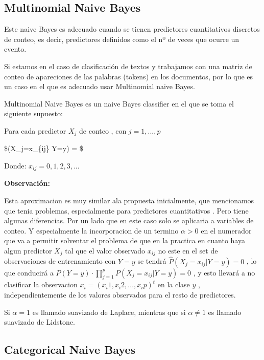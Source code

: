 \documentclass[
  11pt,
  a4paper,
]{article}
\begin{document}
\hypertarget{multinomial-naive-bayes}{%
\subsection{Multinomial Naive Bayes}\label{multinomial-naive-bayes}}

Este naive Bayes es adecuado cuando se tienen predictores cuantitativos
discretos de conteo, es decir, predictores definidos como el nº de veces
que ocurre un evento.

Si estamos en el caso de clasificación de textos y trabajamos con una
matriz de conteo de apareciones de las palabras (tokens) en los
documentos, por lo que es un caso en el que es adecuado usar Multinomial
naive Bayes.

Multinomial Naive Bayes es un naive Bayes classifier en el que se toma
el siguiente supuesto:

Para cada predictor \(X_j\) de conteo , con \(j=1,...,p\)

\$(X\_j=x\_\{ij\} \textbar{} Y=y) =
\$

Donde: \(x_{ij}=0,1,2,3,...\)

\textbf{Observación:}

Esta aproximacion es muy similar ala propuesta inicialmente, que
mencionamos que tenia problemas, especialmente para predictores
cuantitativos . Pero tiene algunas diferencias. Por un lado que en este
caso solo se aplicaria a variables de conteo. Y especialmente la
incorporacion de un termino \(\alpha > 0\) en el numerador que va a
permitir solventar el problema de que en la practica en cuanto haya
algun predictor \(X_j\) tal que el valor observado \(x_{ij}\) no este en
el set de observaciones de entrenamiento con \(Y=y\) se tendrá
\(\widehat{P}(X_j=x_{ij} | Y=y) = 0\) , lo que conducirá a
\(P(Y=y) \cdot\prod_{j=1}^{p} P(X_j=x_{ij} | Y=y) = 0\) , y esto llevará
a no clasificar la observacion \(x_i = (x_i1 , x_i2, ..., x_ip)^t\) en
la clase \(y\) , independientemente de los valores observados para el
resto de predictores.

Si \(\alpha = 1\) es llamado suavizado de Laplace, mientras que si
\(\alpha \neq 1\) es llamado suavizado de Lidstone.

\hypertarget{categorical-naive-bayes}{%
\subsection{Categorical Naive Bayes}\label{categorical-naive-bayes}}
\end{document}
